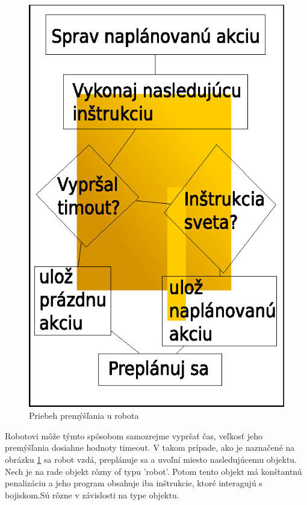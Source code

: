 \begin{figure}
\centering
\includegraphics[totalheight=0.2\textheight,width=.2\textwidth]{thinking}
\caption {Priebeh premýšľania u robota}
\label{thinking}
\end{figure}

Robotovi môže týmto spôsobom samozrejme vypršať čas, veľkosť jeho premýšľania dosiahne hodnoty timeout.%
V takom prípade, ako je naznačené na obrázku \ref{thinking} sa robot vzdá, preplánuje sa a uvoľní miesto nasledujúcemu objektu. 
\newline
Nech je na rade objekt rôzny of typu 'robot'. Potom tento objekt má konštantnú penalizáciu a jeho program obsahuje iba inštrukcie, ktoré interagujú s bojiskom.Sú rôzne v závislosti na type objektu.

